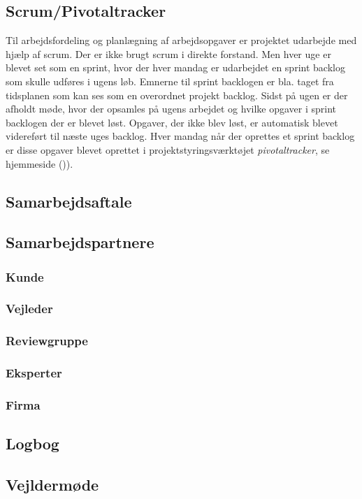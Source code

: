 \subsection{Scrum/Pivotaltracker}
Til arbejdsfordeling og planlægning af arbejdsopgaver er projektet udarbejde med hjælp af scrum. Der er ikke brugt scrum i direkte forstand. Men hver uge er blevet set som en sprint, hvor der hver mandag er udarbejdet en sprint backlog som skulle udføres i ugens løb. Emnerne til sprint backlogen er bla. taget fra tidsplanen som kan ses som en overordnet projekt backlog. Sidst på ugen er der afholdt møde, hvor der opsamles på ugens arbejdet og hvilke opgaver i sprint backlogen der er blevet løst. Opgaver, der ikke blev løst, er automatisk blevet videreført til næste uges backlog. Hver mandag når der oprettes et sprint backlog er disse opgaver blevet oprettet i projektstyringsværktøjet \textit{pivotaltracker}, se hjemmeside ()). 

\subsection{Samarbejdsaftale}
\subsection{Samarbejdspartnere}
\subsubsection{Kunde}
\subsubsection{Vejleder}
\subsubsection{Reviewgruppe}
\subsubsection{Eksperter}
\subsubsection{Firma}

\subsection{Logbog}
\subsection{Vejldermøde}
